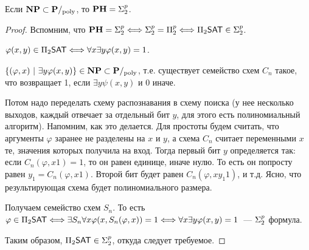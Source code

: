 \begin{theorem} Если $\textbf{NP} \subset \textbf{P}/_{\mathrm{poly}}$, то $\textbf{PH} = \textbf{$\Sigma_{2}^p$}$. \end{theorem}

\begin{proof} Вспомним, что $\textbf{PH} = \textbf{$\Sigma_{2}^p$} \Longleftrightarrow \textbf{$\Sigma_{2}^p$} = \textbf{$\Pi_{2}^p$} \Longleftrightarrow \text{$\Pi_{2}$}\mathsf{SAT} \in \textbf{$\Sigma_{2}^p$}$.

$\varphi(x, y) \in \text{$\Pi_{2}$}\mathsf{SAT} \Longleftrightarrow \forall x \exists y \varphi(x, y) = 1$. %

$\{(\varphi, x) \ | \ \exists y \varphi(x, y)\} \in \textbf{NP} \subset \textbf{P}/_{\mathrm{poly}}$, т.е. существует семейство схем $C_n$ такое, что возвращает 1, если $\exists y \psi (x, y)$ и 0 иначе.

Потом надо переделать схему распознавания в схему поиска (у нее несколько выходов, каждый отвечает за отдельный бит $y$, для этого есть полиномиальный алгоритм). Напомним, как это делается. Для простоты будем считать, что аргументы $\varphi$ заранее не
разделены на $x$ и $y$, а схема $C_n$ считает переменными $x$ те, значения которых получила на вход. Тогда первый бит $y$ определяется так: если $C_n(\varphi, x1)=1$, то он равен единице, иначе нулю. То есть он попросту равен $y_1=C_n(\varphi, x1)$. Второй бит будет равен $C_n(\varphi, xy_1 1)$, и т.д.
Ясно, что результирующая схема будет полиномиального размера.

Получаем семейство схем $S_n$. То есть $\varphi \in \text{$\Pi_{2}$}\mathsf{SAT} \Longleftrightarrow \exists S_n\forall x \varphi(x, S_n(\varphi, x)) = 1 \Longleftrightarrow \forall x \exists y \varphi(x, y) = 1$~--- $\textbf{$\Sigma_{2}^p$}$ формула.

Таким образом, $\text{$\Pi_{2}$}\mathsf{SAT} \in \textbf{$\Sigma_{2}^p$}$, откуда следует требуемое.

\end{proof}